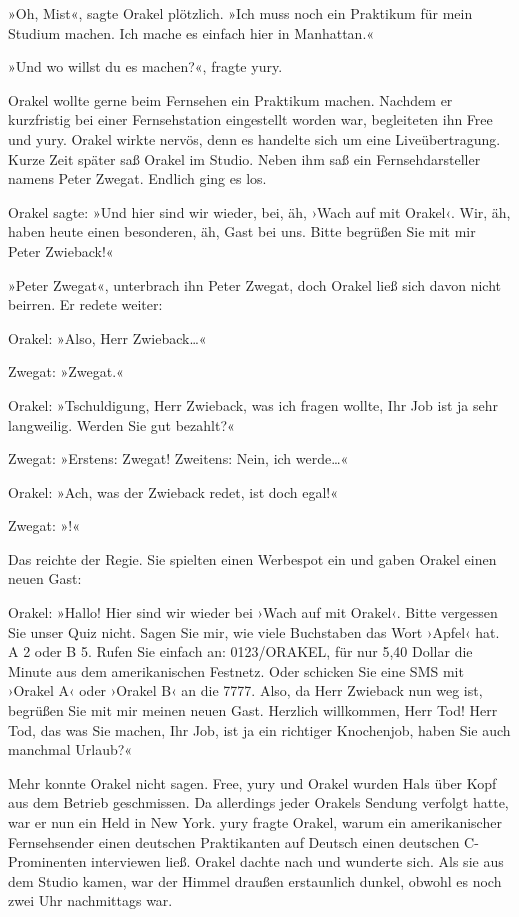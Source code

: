 »Oh, Mist«, sagte Orakel plötzlich. »Ich muss noch ein Praktikum für mein Studium machen. Ich mache es einfach hier in Manhattan.«

»Und wo willst du es machen?«, fragte yury.

Orakel wollte gerne beim Fernsehen ein Praktikum machen. Nachdem er kurzfristig bei einer Fernsehstation eingestellt worden war, begleiteten ihn Free und yury. Orakel wirkte nervös, denn es handelte sich um eine Liveübertragung. Kurze Zeit später saß Orakel im Studio. Neben ihm saß ein Fernsehdarsteller namens Peter Zwegat. Endlich ging es los.

Orakel sagte: »Und hier sind wir wieder, bei, äh, ›Wach auf mit Orakel‹. Wir, äh, haben heute einen besonderen, äh, Gast bei uns. Bitte begrüßen Sie mit mir Peter Zwieback!«

»Peter Zwegat«, unterbrach ihn Peter Zwegat, doch Orakel ließ sich davon nicht beirren. Er redete weiter:

Orakel: »Also, Herr Zwieback…«

Zwegat: »Zwegat.«

Orakel: »Tschuldigung, Herr Zwieback, was ich fragen wollte, Ihr Job ist ja sehr langweilig. Werden Sie gut bezahlt?«

Zwegat: »Erstens: Zwegat! Zweitens: Nein, ich werde…«

Orakel: »Ach, was der Zwieback redet, ist doch egal!«

Zwegat: »!«

Das reichte der Regie. Sie spielten einen Werbespot ein und gaben Orakel einen neuen Gast:

Orakel: »Hallo! Hier sind wir wieder bei ›Wach auf mit Orakel‹. Bitte vergessen Sie unser Quiz nicht. Sagen Sie mir, wie viele Buchstaben das Wort ›Apfel‹ hat. A 2 oder B 5. Rufen Sie einfach an: 0123/ORAKEL, für nur 5,40 Dollar die Minute aus dem amerikanischen Festnetz. Oder schicken Sie eine SMS mit ›Orakel A‹ oder ›Orakel B‹ an die 7777. Also, da Herr Zwieback nun weg ist, begrüßen Sie mit mir meinen neuen Gast. Herzlich willkommen, Herr Tod! Herr Tod, das was Sie machen, Ihr Job, ist ja ein richtiger Knochenjob, haben Sie auch manchmal Urlaub?«

Mehr konnte Orakel nicht sagen. Free, yury und Orakel wurden Hals über Kopf aus dem Betrieb geschmissen. Da allerdings jeder Orakels Sendung verfolgt hatte, war er nun ein Held in New York. yury fragte Orakel, warum ein amerikanischer Fernsehsender einen deutschen Praktikanten auf Deutsch einen deutschen C-Prominenten interviewen ließ. Orakel dachte nach und wunderte sich. Als sie aus dem Studio kamen, war der Himmel draußen erstaunlich dunkel, obwohl es noch zwei Uhr nachmittags war.

